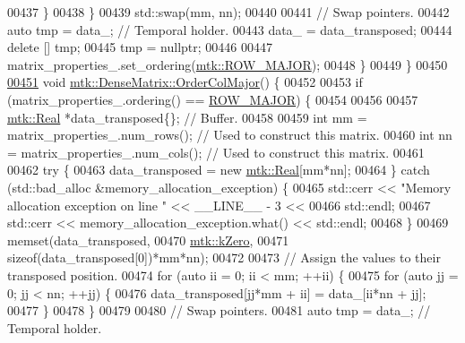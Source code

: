 \begin{DoxyCode}
00437       \}
00438     \}
00439     std::swap(mm, nn);
00440 
00441     \textcolor{comment}{// Swap pointers.}
00442     \textcolor{keyword}{auto} tmp = data\_; \textcolor{comment}{// Temporal holder.}
00443     data\_ = data\_transposed;
00444     \textcolor{keyword}{delete} [] tmp;
00445     tmp = \textcolor{keyword}{nullptr};
00446 
00447     matrix\_properties\_.set\_ordering(\hyperlink{namespacemtk_ga622801bd9f912d0f976c3e383f5f581cabc55178ac16eb1ce89b5f3ab915a91f3}{mtk::ROW\_MAJOR});
00448   \}
00449 \}
00450 
\hypertarget{mtk__dense__matrix_8cc_source_l00451}{}\hyperlink{classmtk_1_1DenseMatrix_a59b9bea24acf39dca64e8549b3527463}{00451} \textcolor{keywordtype}{void} \hyperlink{classmtk_1_1DenseMatrix_a59b9bea24acf39dca64e8549b3527463}{mtk::DenseMatrix::OrderColMajor}() \{
00452 
00453   \textcolor{keywordflow}{if} (matrix\_properties\_.ordering() == \hyperlink{namespacemtk_ga622801bd9f912d0f976c3e383f5f581cabc55178ac16eb1ce89b5f3ab915a91f3}{ROW\_MAJOR}) \{
00454 
00456 
00457     \hyperlink{group__c01-roots_gac080bbbf5cbb5502c9f00405f894857d}{mtk::Real} *data\_transposed\{\}; \textcolor{comment}{// Buffer.}
00458 
00459     \textcolor{keywordtype}{int} mm = matrix\_properties\_.num\_rows(); \textcolor{comment}{// Used to construct this matrix.}
00460     \textcolor{keywordtype}{int} nn = matrix\_properties\_.num\_cols(); \textcolor{comment}{// Used to construct this matrix.}
00461 
00462     \textcolor{keywordflow}{try} \{
00463       data\_transposed = \textcolor{keyword}{new} \hyperlink{group__c01-roots_gac080bbbf5cbb5502c9f00405f894857d}{mtk::Real}[mm*nn];
00464     \} \textcolor{keywordflow}{catch} (std::bad\_alloc &memory\_allocation\_exception) \{
00465       std::cerr << \textcolor{stringliteral}{"Memory allocation exception on line "} << \_\_LINE\_\_ - 3 <<
00466         std::endl;
00467       std::cerr << memory\_allocation\_exception.what() << std::endl;
00468     \}
00469     memset(data\_transposed,
00470           \hyperlink{group__c01-roots_ga59a451a5fae30d59649bcda274fea271}{mtk::kZero},
00471           \textcolor{keyword}{sizeof}(data\_transposed[0])*mm*nn);
00472 
00473     \textcolor{comment}{// Assign the values to their transposed position.}
00474     \textcolor{keywordflow}{for} (\textcolor{keyword}{auto} ii = 0; ii < mm; ++ii) \{
00475       \textcolor{keywordflow}{for} (\textcolor{keyword}{auto} jj = 0; jj < nn; ++jj) \{
00476         data\_transposed[jj*mm + ii] = data\_[ii*nn + jj];
00477       \}
00478     \}
00479 
00480     \textcolor{comment}{// Swap pointers.}
00481     \textcolor{keyword}{auto} tmp = data\_; \textcolor{comment}{// Temporal holder.}

\end{DoxyCode}
